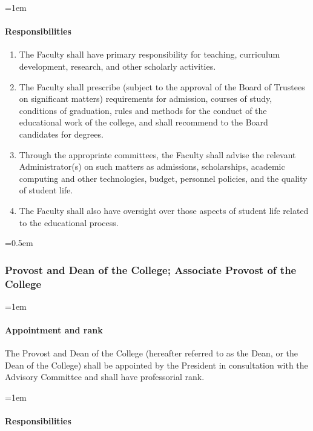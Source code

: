 \documentclass{manual}
\let\oldsubsubsection\subsubsection
\renewcommand\subsubsection{\leftskip=0.5em\oldsubsubsection}
\let\oldparagraph\paragraph
\renewcommand\paragraph{\leftskip=1em\oldparagraph}
\newcommand{\itemLevelA}{\alph*.}
\newcommand{\itemRefA}{\alph*}
\begin{document}
\paragraph{Responsibilities}\label{sub:Responsibilities}
\begin{enumerate}[label=\itemLevelA,ref=\itemRefA]

\item The Faculty shall have primary responsibility for teaching, curriculum development, research, and other scholarly activities.

\item The Faculty shall prescribe (subject to the approval of the Board of Trustees on significant matters) requirements for admission, courses of study, conditions of graduation, rules and methods for the conduct of the educational work of the college, and shall recommend to the Board candidates for degrees.

\item Through the appropriate committees, the Faculty shall advise the relevant Administrator(s) on such matters as admissions, scholarships, academic computing and other technologies, budget, personnel policies, and the quality of student life.

\item The Faculty shall also have oversight over those aspects of student life related to the educational process. 
\end{enumerate}


\subsubsection{Provost and Dean of the College; Associate Provost of the College}


\paragraph{Appointment and rank}
The Provost and Dean of the College (hereafter referred to as the Dean, or the Dean of the College) shall be appointed by the President in consultation with the Advisory Committee and shall have professorial rank.


\paragraph{Responsibilities}
\end{document}
